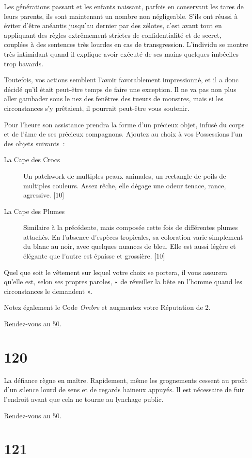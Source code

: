 \documentclass{report}
\newcommand{\gsection}[1]{
    \section{#1}
    \label{section-#1}
}
\newcommand{\glink}[1]{\hyperref[section-#1]{#1}}
\begin{document}
Les générations passant et les enfants naissant, parfois en conservant les tares de leurs parents, ils sont maintenant un nombre non négligeable. S'ils ont réussi à éviter d'être anéantis jusqu'au dernier par des zélotes, c'est avant tout en appliquant des règles extrêmement strictes de confidentialité et de secret, couplées à des sentences très lourdes en cas de transgression. L'individu se montre très intimidant quand il explique avoir exécuté de ses mains quelques imbéciles trop bavards.

Toutefois, vos actions semblent l'avoir favorablement impressionné, et il a donc décidé qu'il était peut-être temps de faire une exception. Il ne va pas non plus aller gambader sous le nez des fenêtres des tueurs de monstres, mais si les circonstances s'y prêtaient, il pourrait peut-être vous soutenir.

Pour l'heure son assistance prendra la forme d'un précieux objet, infusé du corps et de l'âme de ses précieux compagnons. Ajoutez au choix à vos Possessions l'un des objets suivants :
\begin{description}
\item[La Cape des Crocs] Un patchwork de multiples peaux animales, un rectangle de poils de multiples couleurs. Assez rêche, elle dégage une odeur tenace, rance, agressive. [10]
\item[La Cape des Plumes] Similaire à la précédente, mais composée cette fois de différentes plumes attachés. En l'absence d'espèces tropicales, sa coloration varie simplement du blanc au noir, avec quelques nuances de bleu. Elle est aussi légère et élégante que l'autre est épaisse et grossière. [10]
\end{description}

Quel que soit le vêtement sur lequel votre choix se portera, il vous assurera qu'elle est, selon ses propres paroles, « de réveiller la bête en l'homme quand les circonstances le demandent ».

Notez également le Code \emph{Ombre} et augmentez votre Réputation de 2.

Rendez-vous au \glink{50}.

\gsection{120}

La défiance règne en maître. Rapidement, même les grognements cessent au profit d'un silence lourd de sens et de regards haineux appuyés. Il est nécessaire de fuir l'endroit avant que cela ne tourne au lynchage public.

Rendez-vous au \glink{50}.

\gsection{121}
\end{document}
